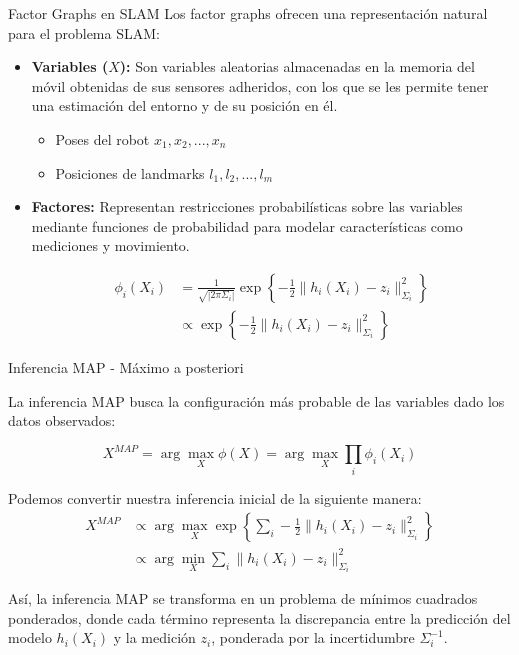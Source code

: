 \documentclass[10pt]{beamer}
\begin{document}
        \begin{frame}{Factor Graphs en SLAM}
            Los factor graphs ofrecen una representación natural para el problema SLAM:
            
            \begin{itemize}
                \item \textbf{Variables ($X$):}
                Son variables aleatorias almacenadas en la memoria del móvil obtenidas de sus sensores adheridos, con los que se les permite tener una estimación del entorno y de su posición en él.
                \begin{itemize}
                    \item Poses del robot $x_1, x_2, ..., x_n$
                    \item Posiciones de landmarks $l_1, l_2, ..., l_m$
                \end{itemize}
                
                \item \textbf{Factores:} Representan restricciones probabilísticas sobre las variables mediante funciones de probabilidad para modelar características como mediciones y movimiento.
                
                \[
                \begin{aligned}
                    \phi_i(X_i) &= \frac{1}{\sqrt{|2\pi \Sigma_i|}} \exp \left\{-\frac{1}{2}\|h_i(X_i) - z_i\|^2_{\Sigma_i} \right\} \\
                    & \propto \exp \left\{-\frac{1}{2}\|h_i(X_i) - z_i\|^2_{\Sigma_i} \right\}
                \end{aligned}
                \]
            \end{itemize}
            
        \end{frame}
        
        \begin{frame}{Inferencia MAP - Máximo a posteriori}
            
            La inferencia MAP busca la configuración más probable de las variables dado los datos observados:
            
            \[
                X^{MAP} = \arg\max_{X}\phi(X) = \arg\max_{X} \prod_i \phi_i(X_i)
            \]
            
            Podemos convertir nuestra inferencia inicial de la siguiente manera:
            \[
            \begin{aligned}
                X^{MAP} &\propto \arg\max_{X} \exp \left\{ \sum_i - \frac{1}{2} \|h_i(X_i) - z_i\|^2_{\Sigma_i} \right\} \\ 
                &\propto \arg\min_{X} \sum_i \|h_i(X_i) - z_i\|^2_{\Sigma_i}
            \end{aligned}
            \]
            
            Así, la inferencia MAP se transforma en un problema de mínimos cuadrados ponderados, donde cada término representa la discrepancia entre la predicción del modelo $h_i(X_i)$ y la medición $z_i$, ponderada por la incertidumbre $\Sigma_i^{-1}$.
            

        \end{frame}
\end{document}

